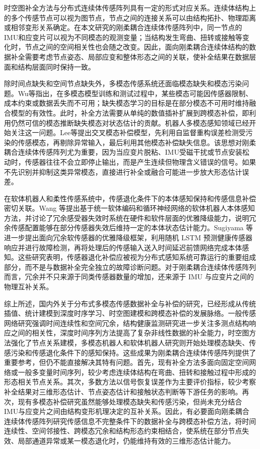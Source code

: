 时空图补全方法与分布式连续体传感阵列具有一定的形式对应关系。连续体结构上的多个传感节点可以视为图节点，节点之间的连接关系可以由结构拓扑、物理距离或相邻变形关系确定。在本文研究的刚柔耦合连续体传感阵列中，同一节点的IMU和应变片可以视为不同模态的观测变量；当结构发生弯曲、扭转或接触等变化时，节点之间的空间相关性也会随之改变。因此，面向刚柔耦合连续体结构的数据补全需要考虑节点姿态、局部应变和整体形态之间的关联，使补全结果在数据层面和结构层面同时保持一致。

除时间点缺失和空间节点缺失外，多模态传感系统还面临模态缺失和模态污染问题。Wu等指出，在多模态模型训练和测试过程中，某些模态可能因传感器限制、成本约束或数据丢失而不可用；缺失模态学习的目标是在部分模态不可用时维持融合模型的有效性\cite{wu2024missingmodality}。此时，补全方法需要从单纯的数值插补扩展到跨模态补偿，即利用仍然可信的模态推断缺失模态对状态估计的贡献。机器人多模态感知领域已经开始关注这一问题。Lee等提出交叉模态补偿模型，先利用自监督重构误差检测受污染的传感模态，再剔除异常输入，最后利用其他模态补偿缺失信息\cite{lee2021detect}。该思想对刚柔耦合连续体传感阵列尤为重要，因为当应变片脱粘、IMU受磁干扰或节点安装松动时，传感器往往不会立即停止输出，而是产生连续但物理含义错误的信号。如果不先识别并抑制这类异常模态，直接进行补全或融合可能进一步放大形态估计误差。

在软体机器人和柔性传感系统中，传感退化条件下的本体感知保持和传感信息补偿密切关联。Wang 等提出基于统一软体编码和循环神经网络的软体机器人本体感知方法，并讨论了冗余感受器失效时系统在硬件和软件层面的优雅降级能力，说明冗余传感配置能够在部分传感器失效后维持一定的本体状态估计能力\cite{wang2023unified}。Sugiyama 等进一步提出面向冗余软传感器的优雅降级框架，利用随机 LSTM 预测健康传感器响应并进行故障检测，再将处理后的传感输入送入时间延迟前馈网络完成本体感知\cite{sugiyama2025graceful}。这些研究表明，传感器退化补偿应被视为分布式感知系统可靠运行的重要组成部分，而不是与数据补全完全独立的故障诊断问题。对于刚柔耦合连续体传感阵列而言，冗余并不只来源于同类传感器数量的增加，还来源于 IMU 与应变片之间的物理互补关系。

综上所述，国内外关于分布式多模态传感数据补全与补偿的研究，已经形成从传统插值、统计建模到深度时序学习、时空图建模和跨模态补偿的发展脉络。一般传感网络研究强调时间连续性和空间冗余，结构健康监测研究进一步关注多测点结构响应之间的相关性，深度时间序列方法提高了复杂非线性数据的补全能力，时空图方法强化了节点关系建模，多模态机器人和软体机器人研究则开始处理模态缺失、传感污染和传感退化条件下的感知保持。这些成果为刚柔耦合连续体传感阵列提供了重要参考，但仍不能直接解决其特有问题。首先，现有补全方法多面向固定空间网络或一般多变量时间序列，较少考虑连续体结构在弯曲、扭转和接触过程中形成的形态相关节点关系。其次，多数方法以信号恢复误差作为主要评价指标，较少考察补全结果对三维形态估计、节点姿态估计和接触状态判断等下游任务的影响。再次，现有多模态补偿研究虽然能够处理模态缺失和传感污染，但尚未充分结合IMU与应变片之间由结构变形机理决定的互补关系。因此，有必要面向刚柔耦合连续体传感阵列研究传感信息不完整条件下的数据补全与跨模态补偿方法，将时间连续性、空间邻接性、跨模态冗余和结构形态约束相结合，使系统在部分节点失效、局部通道异常或某一模态退化时，仍能维持有效的三维形态估计能力。
